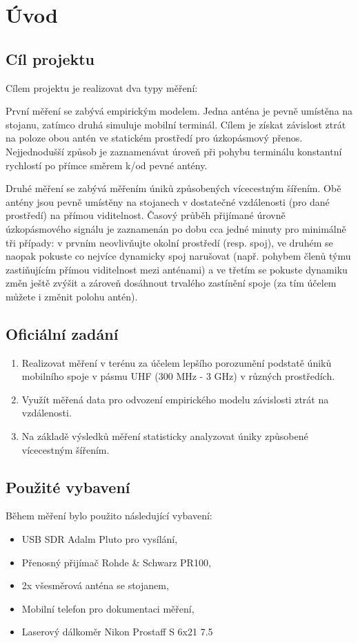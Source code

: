 \chapter*{Úvod} %
\section{Cíl projektu}
Cílem projektu je realizovat dva typy měření:

První měření se zabývá empirickým modelem. Jedna anténa je pevně umístěna na stojanu, zatímco druhá simuluje mobilní terminál. Cílem je získat závislost ztrát na poloze obou antén ve statickém prostředí pro úzkopásmový přenos. Nejjednodušší způsob je zaznamenávat úroveň při pohybu terminálu konstantní rychlostí po přímce směrem k/od pevné antény.

Druhé měření se zabývá měřením úniků způsobených vícecestným šířením. Obě antény jsou pevně umístěny na stojanech v dostatečné vzdálenosti (pro dané prostředí) na přímou viditelnost. Časový průběh přijímané úrovně úzkopásmového signálu je zaznamenán po dobu cca jedné minuty pro minimálně tři případy: v prvním neovlivňujte okolní prostředí (resp. spoj), ve druhém se naopak pokuste co nejvíce dynamicky spoj narušovat (např. pohybem členů týmu zastiňujícím přímou viditelnost mezi anténami) a ve třetím se pokuste dynamiku změn ještě zvýšit a zároveň dosáhnout trvalého zastínění spoje (za tím účelem můžete i změnit polohu antén). 


\section{Oficiální zadání}
\begin{enumerate}
\item Realizovat měření v terénu za účelem lepšího porozumění podstatě úniků mobilního spoje v pásmu UHF (300 MHz - 3 GHz) v různých prostředích. 
\item Využít měřená data pro odvození empirického modelu závislosti ztrát na vzdálenosti. 
\item Na základě výsledků měření statisticky analyzovat úniky způsobené vícecestným šířením. 
\end{enumerate}

\section{Použité vybavení}
Během měření bylo použito následující vybavení:
\begin{itemize}
    \item USB SDR Adalm Pluto pro vysílání, 
    \item Přenosný přijímač Rohde \& Schwarz PR100, 
    \item 2x všesměrová anténa se stojanem, 
    \item Mobilní telefon pro dokumentaci měření,
    \item Laserový dálkoměr Nikon Prostaff S 6x21 7.5
\end{itemize}

